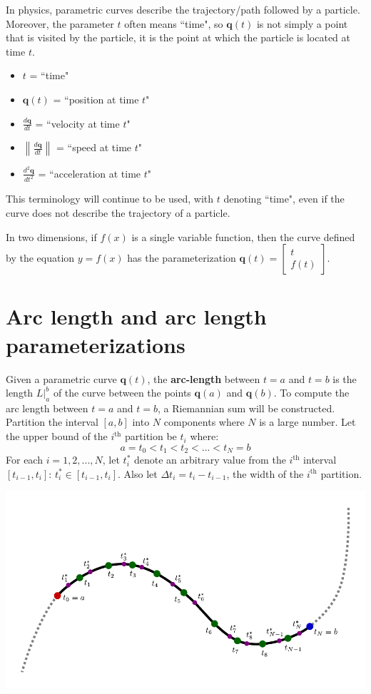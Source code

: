 \documentclass{article}
\begin{document}
In physics, parametric curves describe the trajectory/path followed by a particle. Moreover, the parameter \(t\) often means ``time", so \(\mathbf{q}(t)\) is not simply a point that is visited by the particle, it is the point at which the particle is located at time \(t\). 
\begin{itemize}
\item \(t\) = ``time" 
\item \(\mathbf{q}(t)\) = ``position at time \(t\)" 
\item \(\frac{d\mathbf{q}}{dt}\) = ``velocity at time \(t\)" 
\item \(\left\|\frac{d\mathbf{q}}{dt}\right\|\) = ``speed at time \(t\)" 
\item \(\frac{d^2\mathbf{q}}{dt^2}\) = ``acceleration at time \(t\)" 
\end{itemize}  
This terminology will continue to be used, with \(t\) denoting ``time", even if the curve does not describe the trajectory of a particle.

In two dimensions, if \(f(x)\) is a single variable function, then the curve defined by the equation \(y = f(x)\) has the parameterization \(\mathbf{q}(t) = \begin{bmatrix} t \\ f(t) \end{bmatrix}\).



\section*{Arc length and arc length parameterizations}

Given a parametric curve \(\mathbf{q}(t)\), the {\bf arc-length} between \(t = a\) and \(t = b\) is the length \(L\Big|_a^b\) of the curve between the points \(\mathbf{q}(a)\) and \(\mathbf{q}(b)\). To compute the arc length between \(t = a\) and \(t = b\), a Riemannian sum will be constructed. Partition the interval \([a, b]\) into \(N\) components where \(N\) is a large number. Let the upper bound of the \(i^{\text{th}}\) partition be \(t_i\) where:
\[a = t_0 < t_1 < t_2 < ... < t_N = b\]
For each \(i = 1, 2, ..., N\), let \(t_i^*\) denote an arbitrary value from the \(i^{\text{th}}\) interval \([t_{i-1}, t_i]\): \(t_i^* \in [t_{i-1}, t_i]\). Also let \(\Delta t_i = t_i - t_{i-1}\), the width of the \(i^{\text{th}}\) partition. 

\begin{center}
\includegraphics[width = \textwidth]{arc_length}
\end{center}
\end{document}
